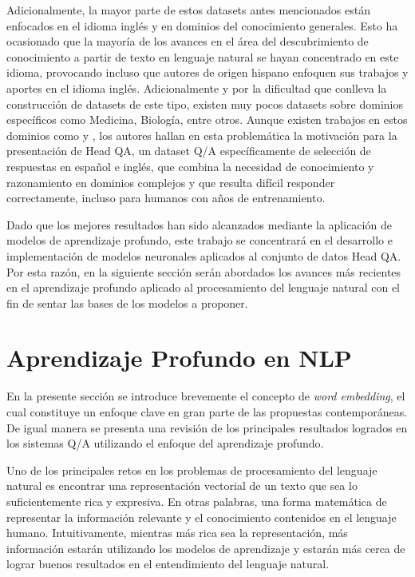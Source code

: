 Adicionalmente, la mayor parte de estos datasets antes mencionados están enfocados en el idioma inglés y en dominios del conocimiento generales. Esto ha ocasionado que la mayoría de los avances en el área del descubrimiento de conocimiento a partir de texto en lenguaje natural se hayan concentrado en este idioma, provocando incluso que autores de origen hispano enfoquen sus trabajos y aportes en el idioma inglés. Adicionalmente y por la dificultad que conlleva la construcción de datasets de este tipo, existen muy pocos datasets sobre dominios específicos como Medicina, Biología, entre otros. Aunque existen trabajos en estos dominios como \cite{2015-semantic-medical-texts} y \cite{2018-nentidis-results}, los autores \cite{2019-head-qa} hallan en esta problemática la motivación para la presentación de Head QA, un dataset Q/A específicamente de selección de respuestas en español e inglés, que combina la necesidad de conocimiento y razonamiento en dominios complejos y que resulta difícil responder correctamente, incluso para humanos con años de entrenamiento.

Dado que los mejores resultados han sido alcanzados mediante la aplicación de modelos de aprendizaje profundo, este trabajo se concentrará en el desarrollo e implementación de modelos neuronales aplicados al conjunto de datos Head QA. Por esta razón, en la siguiente sección serán abordados los avances más recientes en el aprendizaje profundo aplicado al procesamiento del lenguaje natural con el fin de sentar las bases de los modelos a proponer.


\section{Aprendizaje Profundo en NLP}

En la presente sección se introduce brevemente el concepto de \textit{word embedding}, el cual constituye un enfoque clave en gran parte de las propuestas contemporáneas. De igual manera se presenta una revisión de los principales resultados logrados en los sistemas Q/A utilizando el enfoque del aprendizaje profundo.

Uno de los principales retos en los problemas de procesamiento del lenguaje natural es encontrar una representación vectorial de un texto que sea lo suficientemente rica y expresiva. En otras palabras, una forma matemática de representar la información relevante y el conocimiento contenidos en el lenguaje humano. Intuitivamente, mientras más rica sea la representación, más información estarán utilizando los modelos de aprendizaje y estarán más cerca de lograr buenos resultados en el entendimiento del lenguaje natural.

